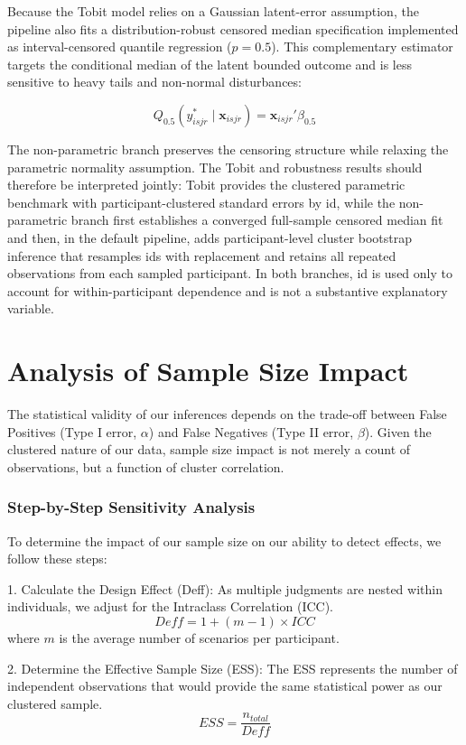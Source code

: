 \documentclass[11pt]{article}
\begin{document}
Because the Tobit model relies on a Gaussian latent-error assumption, the pipeline also fits a distribution-robust censored median specification implemented as interval-censored quantile regression ($p = 0.5$). 
This complementary estimator targets the conditional median of the latent bounded outcome and is less sensitive to heavy tails and non-normal disturbances:

$$Q_{0.5}(y^*_{isjr} \mid \mathbf{x}_{isjr}) = \mathbf{x}_{isjr}'\beta_{0.5}$$

The non-parametric branch preserves the censoring structure while relaxing the parametric normality assumption. The Tobit and robustness results should therefore be interpreted jointly: Tobit provides the clustered parametric benchmark with participant-clustered standard errors by id, while the non-parametric branch first establishes a converged full-sample censored median fit and then, in the default pipeline, adds participant-level cluster bootstrap inference that resamples ids with replacement and retains all repeated observations from each sampled participant. In both branches, id is used only to account for within-participant dependence and is not a substantive explanatory variable.

\section{Analysis of Sample Size Impact}
The statistical validity of our inferences depends on the trade-off between False Positives (Type I error, $\alpha$) 
and False Negatives (Type II error, $\beta$). Given the clustered nature of our data, sample size impact is not 
merely a count of observations, but a function of cluster correlation.

\subsubsection{Step-by-Step Sensitivity Analysis}
To determine the impact of our sample size on our ability to detect effects, we follow these steps:

1. Calculate the Design Effect (Deff): As multiple judgments are nested within individuals, we adjust for the Intraclass Correlation (ICC).
$$Deff = 1 + (m - 1) \times ICC$$
where $m$ is the average number of scenarios per participant. 

2. Determine the Effective Sample Size (ESS): The ESS represents the number of independent observations that would provide the same statistical power as our clustered sample.
$$ESS = \frac{n_{total}}{Deff}$$
\end{document}
